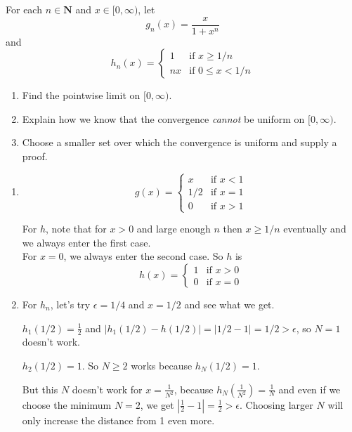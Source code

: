 \documentclass{oxmathproblems}
\begin{document}
\begin{questions}
\miquestion For each $n \in \textbf{N}$ and $x \in [0, \infty)$, let
\[g_{n}(x)=\frac{x}{1+x^{n}}\]
and 
  \[
    h_{n}(x) = \begin{cases}
      1 & \text{if } x \geq 1/n\\
      nx & \text{if } 0 \leq x < 1/n
    \end{cases}
  \]
\begin{enumerate}[label=(\alph*)]
  \item Find the pointwise limit on $[0, \infty)$.
  \item Explain how we know that the convergence \textit{cannot} be uniform on $[0, \infty)$.
  \item Choose a smaller set over which the convergence is uniform and supply a proof.
\end{enumerate}

\begin{solution}
  \begin{enumerate}[label=(\alph*)]
    \item
    \[
        g(x) = \begin{cases}
          x & \text{if } x < 1\\
          1/2 & \text{if } x = 1\\
          0 & \text{if } x > 1
        \end{cases}
    \]

    For $h$, note that for $x > 0$ and large enough $n$ then $x \geq 1/n$ eventually and we always enter the first case.\\
    For $x=0$, we always enter the second case. So $h$ is
    \[
        h(x) = \begin{cases}
          1 & \text{if } x > 0\\
          0 & \text{if } x = 0
        \end{cases}
    \]

    \item For $h_{n}$, let's try $\epsilon=1/4$ and $x=1/2$ and see what we get.
    
    $h_{1}(1/2)=\frac{1}{2}$ and $|h_{1}(1/2)-h(1/2)|=|1/2 - 1|=1/2 > \epsilon$, so $N=1$ doesn't work.

    $h_{2}(1/2)=1$. So $N \geq 2$ works because $h_{N}(1/2)=1$.

    But this $N$ doesn't work for $x = \frac{1}{N^{2}}$, because $h_{N}(\frac{1}{N^2})=\frac{1}{N}$ and even if we choose the minimum $N=2$, we
    get $|\frac{1}{2}-1|=\frac{1}{2} > \epsilon$. Choosing larger $N$ will only increase the distance from 1 even more.


\end{enumerate}
\end{solution}
\end{questions}
\end{document}
